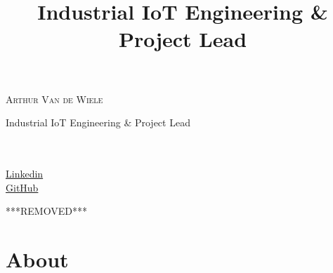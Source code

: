 \documentclass[10pt,a4paper]{moderncv}
\title{Industrial IoT Engineering \& Project Lead}
\begin{document}
\begin{minipage}{0.70\textwidth}
    {\color{color1}\Huge\scshape Arthur Van de Wiele}
    \vspace{0.5em}
    {\par\color{color2}\Large Industrial IoT Engineering \& Project Lead}
\end{minipage}
\begin{minipage}{0.30\textwidth}
    \emailsymbol\hspace{1em} \\
    \mobilephonesymbol\hspace{1em }\\
    \faLinkedin\hspace{1em} \href{https://www.linkedin.com/in/arthur-van-de-wiele/}{Linkedin}\\
    \faGithubSquare\hspace{1em} \href{https://www.linkedin.com/in/arthur-van-de-wiele/}{GitHub}
\end{minipage}

\vspace{1em}
{\par\color{color2}***REMOVED***}

\section{About}
\end{document}
